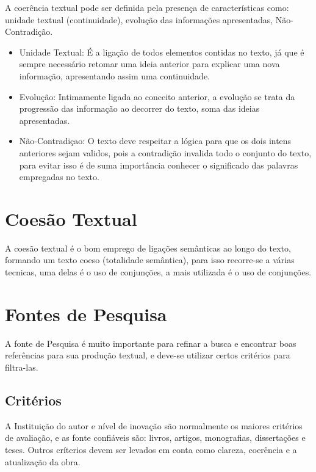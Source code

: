 \documentclass[12pt]{article}
\begin{document}
A coerência textual pode ser definida pela presença de características como: unidade textual (continuidade), evolução das informações apresentadas, Não-Contradição.

\begin{itemize}

	\item Unidade Textual: É a ligação de todos elementos contidas no texto, já que é sempre necessário retomar uma ideia anterior para explicar uma nova informação,
	 apresentando assim uma continuidade.
	\item Evolução: Intimamente ligada ao conceito anterior, a evolução se trata da progressão das informação ao decorrer do texto, soma das ideias apresentadas.
	\item Não-Contradiçao: O texto deve respeitar a lógica para que os dois intens anteriores sejam validos, pois a contradição invalida todo o conjunto do texto,
	para evitar isso é de suma importância conhecer o significado das palavras empregadas no texto.
	
\end{itemize}


\section{Coesão Textual}

A coesão textual é o bom emprego de ligações semânticas ao longo do texto,
 formando um texto coeso (totalidade semântica), para isso recorre-se a várias
tecnicas, uma delas é o uso de conjunções, a mais utilizada é o uso de conjunções.

%

\section{Fontes de Pesquisa}

	A fonte de Pesquisa é muito importante para refinar a busca e encontrar boas referências
	para sua produção textual, e deve-se utilizar certos critérios para filtra-las.

\subsection{Critérios}
	A Instituição do autor e nível de inovação são normalmente os maiores critérios de avaliação, e as fonte confiáveis são:
	livros, artigos, monografias, dissertações e teses. Outros críterios devem ser levados em conta como clareza, coerência e
	a atualização da obra. 
	
\end{document}
